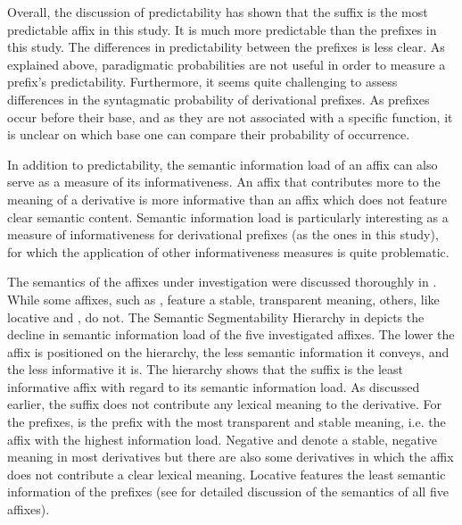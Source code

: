 {Overall, the discussion of predictability has shown that the suffix  is the most predictable affix in this study. It is much more predictable than the prefixes in this study. The differences in predictability between the prefixes is less clear. As explained above, paradigmatic probabilities are not useful in order to measure a prefix's predictability. Furthermore, it seems quite challenging to assess differences in the syntagmatic probability of derivational prefixes. As prefixes occur before their base, and as they are not associated with a specific function, it is unclear on which base one can compare their probability of occurrence.





In addition to predictability, the semantic information load of an affix can also serve as a measure of its informativeness. An affix that contributes more to the meaning of a derivative is more informative than an affix which does not feature clear semantic content. Semantic information load is particularly interesting as a measure of informativeness for derivational prefixes (as the ones in this study), for which the application of other informativeness measures is quite problematic. 

The semantics of the affixes under investigation were discussed thoroughly in . While some affixes, such as , feature a stable, transparent meaning, others, like locative  and , do not. The Semantic Segmentability Hierarchy in  depicts the decline in semantic information load of the five investigated affixes.
 The lower the affix is positioned on the hierarchy, the less semantic information it conveys, and the less informative it is. The hierarchy shows that the suffix  is the least informative affix with regard to its semantic information load.  As discussed earlier, the suffix does not contribute any lexical meaning to the derivative. 
 For the prefixes,  is the prefix with the most transparent and stable meaning, i.e. the affix with the highest information load. Negative  and  denote a stable, negative meaning in most derivatives but there are also some derivatives in which the affix does not contribute a clear lexical meaning. Locative  features the least semantic information of the prefixes (see  for detailed discussion of the semantics of all five affixes). 

}
